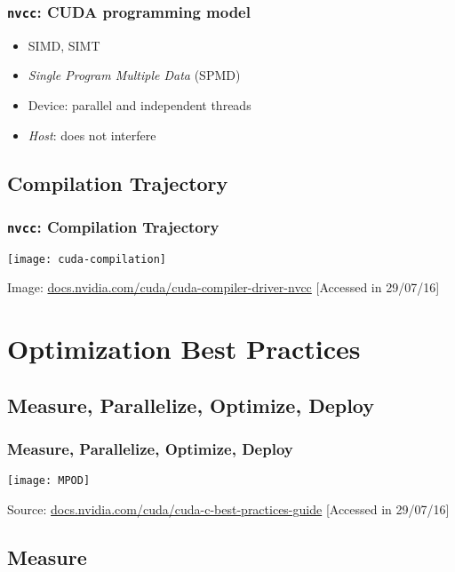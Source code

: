 \documentclass[10pt, compress]{beamer}
\begin{document}
\begin{frame}
    \frametitle{\texttt{nvcc}: CUDA programming model}
    \begin{itemize}
        \item SIMD, SIMT
        \item \textit{Single Program Multiple Data} (SPMD)

        \item Device: \alert{parallel} and \alert{independent} threads
        \item \textit{Host}: does not interfere
    \end{itemize}
\end{frame}

\subsection{Compilation Trajectory}

\begin{frame}
    \frametitle{\texttt{nvcc}: Compilation Trajectory}
    \centering
    \texttt{[image: cuda-compilation]}
    \vfill

    \begin{center}
        \tiny{Image: \url{docs.nvidia.com/cuda/cuda-compiler-driver-nvcc} [Accessed in 29/07/16]}
    \end{center}
\end{frame}

\section{Optimization Best Practices}

\subsection{Measure, Parallelize, Optimize, Deploy}

\begin{frame}
    \frametitle{Measure, Parallelize, Optimize, Deploy}
    \centering
    \texttt{[image: MPOD]}
    \vfill

    \begin{center}
        \tiny{Source: \url{docs.nvidia.com/cuda/cuda-c-best-practices-guide} [Accessed in 29/07/16]}
    \end{center}
\end{frame}

\subsection{Measure}
\end{document}
